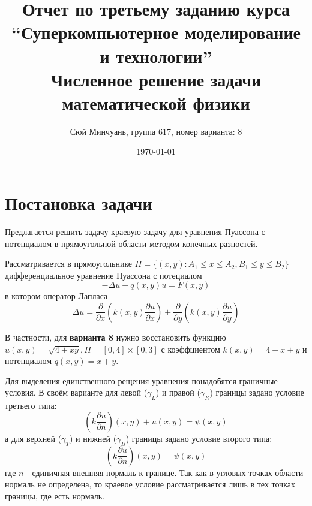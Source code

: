 \documentclass{article}
\title{Отчет по третьему заданию курса \\
“Суперкомпьютерное моделирование и технологии”\\
Численное решение задачи математической физики}
\author{Сюй Минчуань, группа 617, номер варианта: 8}
\date{\today}
\begin{document}
\maketitle
\tableofcontents

\newpage
\section{Постановка задачи}

Предлагается решить задачу краевую задачу для уравнения Пуассона с потенциалом в прямоугольной области методом конечных разностей.

Рассматривается в прямоугольнике $\Pi = \{(x,y): A_1 \leqslant x \leqslant A_2, B_1 \leqslant y \leqslant B_2\}$ дифференциальное уравнение Пуассона с потециалом
\begin{equation*}
    -\Delta u + q(x,y)u = F(x,y)
\end{equation*}
в котором оператор Лапласа 
\begin{equation*}
    \Delta u = \frac{\partial}{\partial x} \left(k(x,y)\frac{\partial u}{\partial x} \right) + \frac{\partial}{\partial y}\left(k(x,y)\frac{\partial u}{\partial y} \right)
\end{equation*}

В частности, для \textbf{варианта 8} нужно восстановить функцию $u(x,y)=\sqrt{4+xy}, \Pi = [0,4] \times [0,3]$ с коэффциентом $k(x,y) = 4 + x + y$ и потенциалом $q(x,y) = x + y$. 

Для выделения единственного рещения уравнения понадобятся граничные условия. В своём варианте для левой ($\gamma_L$) и правой ($\gamma_R$) границы задано условие третьего типа:
\begin{equation*}
    \left( k\frac{\partial u}{\partial n}\right)(x,y) + u(x,y) = \psi(x,y)
\end{equation*}
а для верхней ($\gamma_T$) и нижней ($\gamma_B$) границы задано условие второго типа:
\begin{equation*}
    \left( k\frac{\partial u}{\partial n}\right)(x,y) = \psi(x,y)
\end{equation*}
где $n$ - единичная внешняя нормаль к границе. Так как в угловых точках области нормаль не определена, то краевое условие рассматривается лишь в тех точках границы, где есть нормаль.
\end{document}

